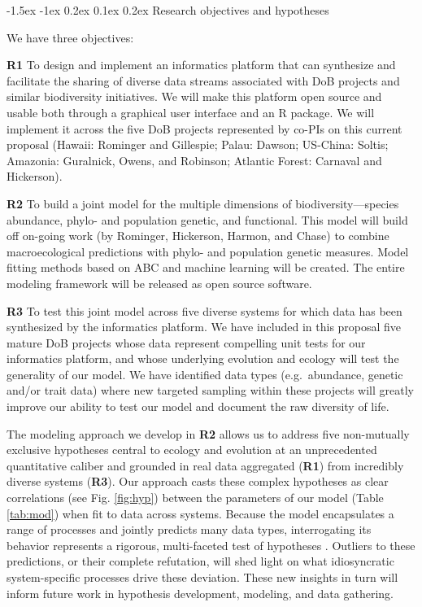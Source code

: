 \documentclass[11pt]{article}
\makeatletter
\renewcommand\subsection{\@startsection{subsection}{1}{\z@}%
                                  {-1.5ex \@plus -1ex \@minus 0.2ex}%
                                  {0.1ex \@plus 0.2ex}%
                                  {\normalfont\large\bfseries}}
\makeatother
\begin{document}
\subsection{Research objectives and
hypotheses}\label{research-objectives-and-hypotheses}

We have three objectives:

\textbf{R1} To design and implement an informatics platform that can
synthesize and facilitate the sharing of diverse data streams
associated with DoB projects and similar biodiversity initiatives. We
will make this platform open source and usable both through a
graphical user interface and an R \cite{R_Development_Core2013-ze}
package. We will implement it across the five DoB projects represented
by co-PIs on this current proposal (Hawaii: Rominger and Gillespie;
Palau: Dawson; US-China: Soltis; Amazonia: Guralnick, Owens, and
Robinson; Atlantic Forest: Carnaval and Hickerson).

\textbf{R2} To build a joint model for the multiple dimensions of
biodiversity---species abundance, phylo- and population genetic, and
functional. This model will build off on-going work (by Rominger,
Hickerson, Harmon, and Chase) to combine macroecological predictions
with phylo- and population genetic measures. Model fitting methods
based on ABC and machine learning will be created. The entire modeling
framework will be released as open source software.

\textbf{R3} To test this joint model across five diverse systems for
which data has been synthesized by the informatics platform. We have
included in this proposal five mature DoB projects whose data
represent compelling unit tests for our informatics platform, and
whose underlying evolution and ecology will test the generality of our
model. We have identified data types (e.g.~abundance, genetic and/or
trait data) where new targeted sampling within these projects will
greatly improve our ability to test our model and document the raw
diversity of life.

The modeling approach we develop in \textbf{R2} allows us to address
five non-mutually exclusive hypotheses central to ecology and
evolution at an unprecedented quantitative caliber and grounded in
real data aggregated (\textbf{R1}) from incredibly diverse systems
(\textbf{R3}). Our approach casts these complex hypotheses as clear
correlations (see Fig. \ref{fig:hyp}) between the parameters of our
model (Table \ref{tab:mod}) when fit to data across systems. Because
the model encapsulates a range of processes and jointly predicts many
data types, interrogating its behavior represents a rigorous,
multi-faceted test of hypotheses
\cite{McGill2003-sf,McGill2007-zd,Leibold2017-jv}. Outliers to these
predictions, or their complete refutation, will shed light on what
idiosyncratic system-specific processes drive these deviation. These
new insights in turn will inform future work in hypothesis
development, modeling, and data gathering.
\end{document}

